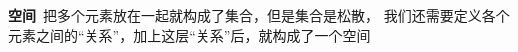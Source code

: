 \begin{Chinese Note}
    \textbf{空间}\ 把多个元素放在一起就构成了集合，但是集合是松散，
    我们还需要定义各个元素之间的“关系”，加上这层“关系”后，就构成了一个空间
\end{Chinese Note}